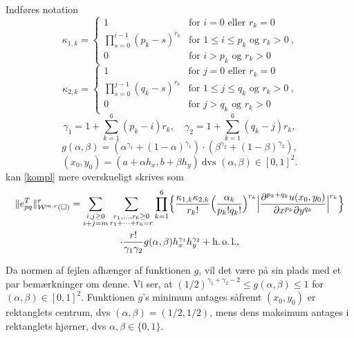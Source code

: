 Indføres notation
\begin{equation}
\kappa_{1,k}=
\left\{
  \begin{array}{ll}
    1 & \mbox{for $i=0$ eller $r_k=0$} \\
    \prod_{s=0}^{i-1}(p_k-s)^{r_k} &
      \mbox{for $1\leq i\leq p_k$ og $r_k>0 \ $,} \\
    0 & \mbox{for $i>p_k$ og $r_k>0$}
  \end{array}
\right.
\end{equation}
\begin{equation}
\kappa_{2,k}=
\left\{
  \begin{array}{ll}
    1 & \mbox{for $j=0$ eller $r_k=0$} \\
    \prod_{s=0}^{j-1}(q_k-s)^{r_k} &
      \mbox{for $1\leq j\leq q_k$ og $r_k>0 \ $,} \\
    0 & \mbox{for $j>q_k$ og $r_k>0$}
  \end{array}
\right.
\end{equation}
\begin{equation}
  \gamma_1 = 1 + \sum_{k=1}^6(p_k -i)r_k, \quad
  \gamma_2 = 1 + \sum_{k=1}^6(q_k -j)r_k,
\end{equation}
\begin{equation}
  g(\alpha,\beta) = (\alpha^{\gamma_1} + (1-\alpha)^{\gamma_1})\cdot
  (\beta^{\gamma_2} + (1-\beta)^{\gamma_2}),
\end{equation}
\begin{equation}
  (x_0,y_0) = (a+\alpha h_x,b+\beta h_y) \
  \text{dvs $(\alpha ,\beta )\in [0,1]^2$.}
\end{equation}
kan \eqref{kompl} mere overskueligt skrives som
\begin{multline}
  \|e_{pq}^T\|_{{\mathcal W}^{m,r}(\Box)}^r = \sum_{\substack{ i,j\geq 0 \\ i+j=m }}
  \sum_{\substack{ r_1,\ldots ,r_6 \geq 0 \\ r_1+\cdots +r_6=r}}
  \prod_{k=1}^6 \Bigl\{ \frac{\kappa_{1,k}\kappa_{2,k}}{r_k!}
  \Bigl( \frac{\alpha_k}{p_k!q_k!} \Bigr)^{r_k}
  \Bigl| \frac{\partial^{p_k+q_k} u(x_0,y_0)}{\partial x^{p_k} \partial y^{q_k}}
  \Bigr|^{r_k} \Bigr\}\\
  \cdot \frac{r!}{\gamma_1\gamma_2} g(\alpha ,\beta)
  h_x^{\gamma_1} h_y^{\gamma_2} + \operatorname{h.o.l.} ,
\end{multline}

Da normen af fejlen afhænger af funktionen $g$, vil det være på sin
plads med et par bemærkninger om denne. Vi ser, at $(1/2)^{\gamma_1
+\gamma_2 -2} \leq g(\alpha ,\beta) \leq 1$ for $(\alpha ,\beta)\in
[0,1]^2$. Funktionen $g$'s minimum antages såfremt $(x_0,y_0)$ er
rektanglets centrum, dvs $(\alpha ,\beta)=(1/2,1/2)$, mens dens
maksimum antages i rektanglets hjørner, dvs $\alpha ,\beta \in
\{0,1\}$.

